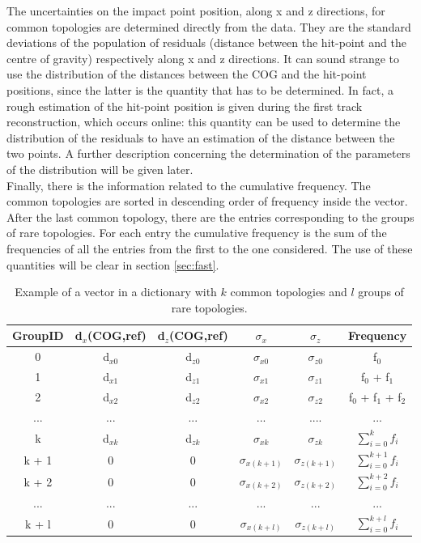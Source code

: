 The uncertainties on the impact point position, along x and z directions, for common topologies are determined directly from the data. They are the standard deviations of the population of residuals (distance between the hit-point and the centre of gravity) respectively along x and z directions. It can sound strange to use the distribution of the distances between the COG and the hit-point positions, since the latter is the quantity that has to be determined. In fact, a rough estimation of the hit-point position is given during the first track reconstruction, which occurs online: this quantity can be used to determine the distribution of the residuals to have an estimation of the distance between the two points. A further description concerning the determination of the parameters of the distribution will be given later.\\
Finally, there is the information related to the cumulative frequency. The common topologies are sorted in descending order of frequency inside the vector. After the last common topology, there are the entries corresponding to the groups of rare topologies. For each entry the cumulative frequency is the sum of the frequencies of all the entries from the first to the one considered. The use of these quantities will be clear in section \ref{sec:fast}.
%
\begin{table}
\centering
\renewcommand\arraystretch{1.5}
 \begin{tabular}{|c|c|c|c|c|c|}
  \hline
  GroupID & d$_x$(COG,ref) & d$_z$(COG,ref) & $\sigma_x$ & $\sigma_z$ & Frequency\\
  \hline
  0 & d$_{x0}$ & d$_{z0}$ & $\sigma_{x0}$ & $\sigma_{z0}$ & f$_0$\\
  1 & d$_{x1}$ & d$_{z1}$ & $\sigma_{x1}$ & $\sigma_{z1}$ & f$_0$ + f$_1$\\
  2 & d$_{x2}$ & d$_{z2}$ & $\sigma_{x2}$ & $\sigma_{z2}$ & f$_0$ + f$_1$ + f$_2$\\
  ... & ... & ... & ... & .... & ... \\
  k & d$_{xk}$ & d$_{zk}$ & $\sigma_{xk}$ & $\sigma_{zk}$ & $\sum_{i=0}^{k} f_i$ \\
  k + 1 & 0 & 0 & $\sigma_{x(k+1)}$ & $\sigma_{z(k+1)}$ & $\sum_{i=0}^{k+1} f_i$\\
  k + 2 & 0 & 0 & $\sigma_{x(k+2)}$ & $\sigma_{z(k+2)}$ & $\sum_{i=0}^{k+2} f_i$\\
  ... & ... & ... & ... & ... & ...\\
  k + l & 0 & 0 & $\sigma_{x(k+l)}$ & $\sigma_{z(k+l)}$ & $\sum_{i=0}^{k+l} f_i$\\
  \hline
 \end{tabular}
 \caption{Example of a vector in a dictionary with $k$ common topologies and $l$ groups of rare topologies.}
 \label{tab:vec}
\end{table}
%

